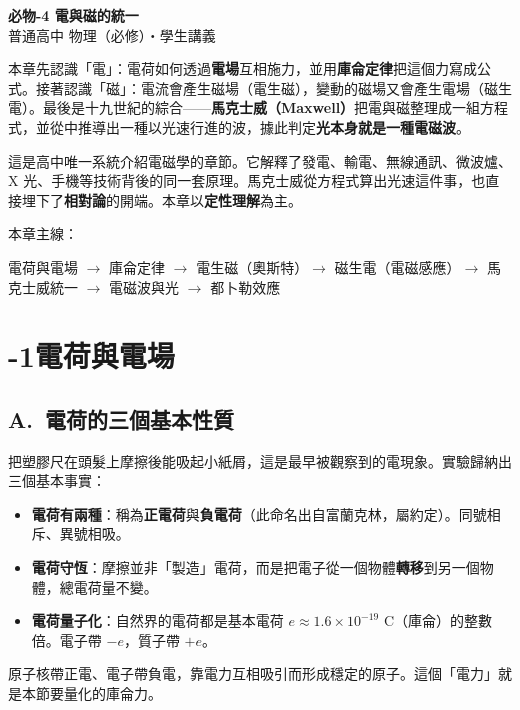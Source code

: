 \documentclass[11pt]{article}
\begin{document}
\begin{center}
{\sffamily\Huge\bfseries 必物-4 電與磁的統一}\\[3pt]
{\sffamily\large 普通高中 物理（必修）・學生講義}
\end{center}
\vspace{0.6em}

本章先認識「電」：電荷如何透過\textbf{電場}互相施力，並用\textbf{庫侖定律}把這個力寫成公式。接著認識「磁」：電流會產生磁場（電生磁），變動的磁場又會產生電場（磁生電）。最後是十九世紀的綜合——\textbf{馬克士威（Maxwell）}把電與磁整理成一組方程式，並從中推導出一種以光速行進的波，據此判定\textbf{光本身就是一種電磁波}。

這是高中唯一系統介紹電磁學的章節。它解釋了發電、輸電、無線通訊、微波爐、X 光、手機等技術背後的同一套原理。馬克士威從方程式算出光速這件事，也直接埋下了\textbf{相對論}的開端。本章以\textbf{定性理解}為主。

\medskip
本章主線：

\begin{center}
電荷與電場 $\rightarrow$ 庫侖定律 $\rightarrow$ 電生磁（奧斯特）$\rightarrow$ 磁生電（電磁感應）$\rightarrow$ 馬克士威統一 $\rightarrow$ 電磁波與光 $\rightarrow$ 都卜勒效應
\end{center}

\section*{-1\quad 電荷與電場}

\subsection*{\sffamily A.\ 電荷的三個基本性質}

把塑膠尺在頭髮上摩擦後能吸起小紙屑，這是最早被觀察到的電現象。實驗歸納出三個基本事實：

\begin{itemize}\setlength{\itemsep}{1pt}
\item \textbf{電荷有兩種}：稱為\textbf{正電荷}與\textbf{負電荷}（此命名出自富蘭克林，屬約定）。同號相斥、異號相吸。
\item \textbf{電荷守恆}：摩擦並非「製造」電荷，而是把電子從一個物體\textbf{轉移}到另一個物體，總電荷量不變。
\item \textbf{電荷量子化}：自然界的電荷都是基本電荷 $e\approx1.6\times10^{-19}$ C（庫侖）的整數倍。電子帶 $-e$，質子帶 $+e$。
\end{itemize}

原子核帶正電、電子帶負電，靠電力互相吸引而形成穩定的原子。這個「電力」就是本節要量化的庫侖力。
\end{document}
